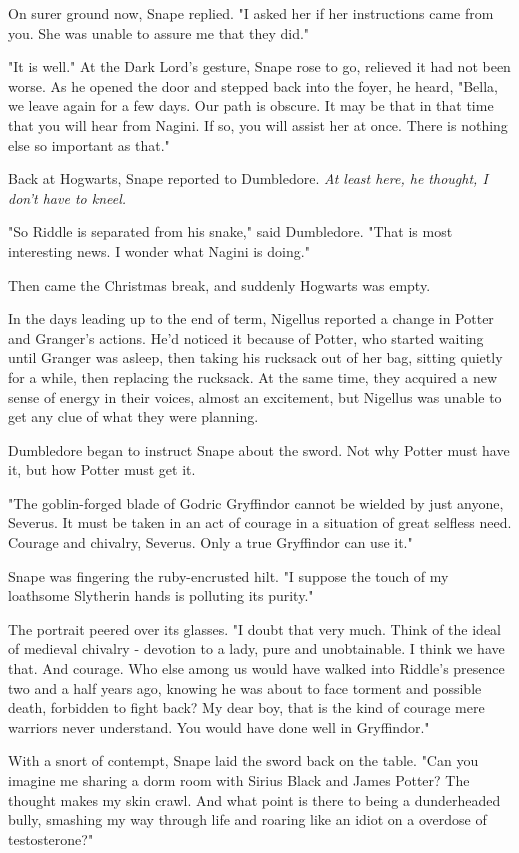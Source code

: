 \documentclass[a4paper,11pt]{article}
\begin{document}
On surer ground now, Snape replied. "I asked her if her instructions came from you. She was unable to assure me that they did."

"It is well." At the Dark Lord's gesture, Snape rose to go, relieved it had not been worse. As he opened the door and stepped back into the foyer, he heard, "Bella, we leave again for a few days. Our path is obscure. It may be that in that time that you will hear from Nagini. If so, you will assist her at once. There is nothing else so important as that."

Back at Hogwarts, Snape reported to Dumbledore. \emph{At least here, he thought, I don't have to kneel.}

"So Riddle is separated from his snake," said Dumbledore. "That is most interesting news. I wonder what Nagini is doing."

Then came the Christmas break, and suddenly Hogwarts was empty.

In the days leading up to the end of term, Nigellus reported a change in Potter and Granger's actions. He'd noticed it because of Potter, who started waiting until Granger was asleep, then taking his rucksack out of her bag, sitting quietly for a while, then replacing the rucksack. At the same time, they acquired a new sense of energy in their voices, almost an excitement, but Nigellus was unable to get any clue of what they were planning.

Dumbledore began to instruct Snape about the sword. Not why Potter must have it, but how Potter must get it.

"The goblin-forged blade of Godric Gryffindor cannot be wielded by just anyone, Severus. It must be taken in an act of courage in a situation of great selfless need. Courage and chivalry, Severus. Only a true Gryffindor can use it."

Snape was fingering the ruby-encrusted hilt. "I suppose the touch of my loathsome Slytherin hands is polluting its purity."

The portrait peered over its glasses. "I doubt that very much. Think of the ideal of medieval chivalry - devotion to a lady, pure and unobtainable. I think we have that. And courage. Who else among us would have walked into Riddle's presence two and a half years ago, knowing he was about to face torment and possible death, forbidden to fight back? My dear boy, that is the kind of courage mere warriors never understand. You would have done well in Gryffindor."

With a snort of contempt, Snape laid the sword back on the table. "Can you imagine me sharing a dorm room with Sirius Black and James Potter? The thought makes my skin crawl. And what point is there to being a dunderheaded bully, smashing my way through life and roaring like an idiot on a overdose of testosterone?"
\end{document}
